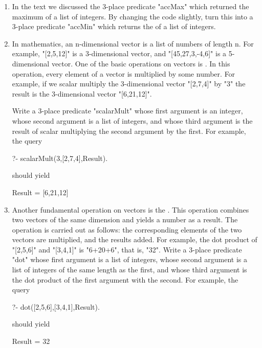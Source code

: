 \begin{enumerate}
\item{}In the text we discussed the 3-place predicate "accMax"
which  returned the maximum of a list of integers.  By changing
the code slightly, turn this into a 3-place predicate "accMin"
which returns the  of a list of integers.
\item{}In mathematics, an n-dimensional vector is a list of numbers of
length n. For example, "[2,5,12]" is a 3-dimensional vector, and
"[45,27,3,-4,6]" is a 5-dimensional vector.  One of the basic
operations on vectors is . In this
operation, every element of a vector is multiplied by some number.
For example, if we scalar multiply the 3-dimensional vector
"[2,7,4]" by "3" the result is the 3-dimensional vector
"[6,21,12]".


Write a 3-place predicate "scalarMult" whose first
argument is an integer, whose second argument is a list of integers,
and whose third argument is the result of scalar multiplying
the second argument by the first. For example, the query
\begin{LPNcodedisplay}
?- scalarMult(3,[2,7,4],Result).
\end{LPNcodedisplay}

should yield
\begin{LPNcodedisplay}
Result = [6,21,12]
\end{LPNcodedisplay}

\item{}Another fundamental operation on vectors is the .  This operation combines two vectors of the same dimension
and yields a number as a result. The operation is carried out as
follows: the corresponding elements of the two vectors are multiplied,
and the results added. For example, the dot product of "[2,5,6]"
and "[3,4,1]" is "6+20+6", that is, "32".  Write a
3-place predicate "dot" whose first argument is a list of
integers, whose second argument is a list of integers of the same
length as the first, and whose third argument is the dot product of
the first argument with the second.  For example, the query
\begin{LPNcodedisplay}
?- dot([2,5,6],[3,4,1],Result).
\end{LPNcodedisplay}

should yield
\begin{LPNcodedisplay}
Result = 32
\end{LPNcodedisplay}

\end{enumerate}
